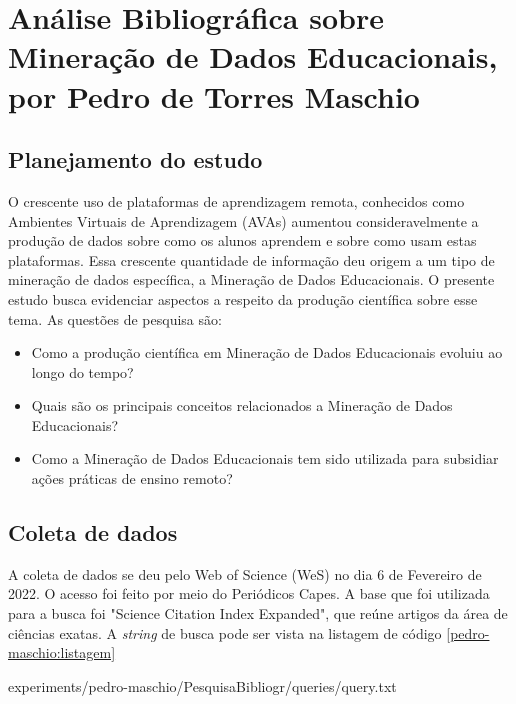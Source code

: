 \chapter{Análise Bibliográfica sobre Mineração de Dados Educacionais, por Pedro de Torres Maschio\label{chap:bibliometria:pedro-maschio}}


\section{Planejamento do estudo}

O crescente uso de plataformas de aprendizagem remota, conhecidos como Ambientes Virtuais de Aprendizagem (AVAs) aumentou consideravelmente a produção de dados sobre como os alunos aprendem e sobre como usam estas plataformas. Essa crescente quantidade de informação deu origem a um tipo de mineração de dados específica, a Mineração de Dados Educacionais. O presente estudo busca evidenciar aspectos a respeito da produção científica sobre esse tema. As questões de pesquisa são:

\begin{itemize}
    \item Como a produção científica em Mineração de Dados Educacionais evoluiu ao longo do tempo?
    \item Quais são os principais conceitos relacionados a Mineração de Dados Educacionais?
    \item Como a Mineração de Dados Educacionais tem sido utilizada para subsidiar ações práticas de ensino remoto?
\end{itemize}

\section{Coleta de dados}

A coleta de dados se deu pelo Web of Science (WeS) no dia 6 de Fevereiro de 2022. O acesso foi feito por meio do Periódicos Capes. A base que foi utilizada para a busca foi "Science Citation Index Expanded", que reúne artigos da área de ciências exatas. A \textit{string} de busca pode ser vista na listagem de código \ref{pedro-maschio:listagem}


{experiments/pedro-maschio/PesquisaBibliogr/queries/query.txt}


